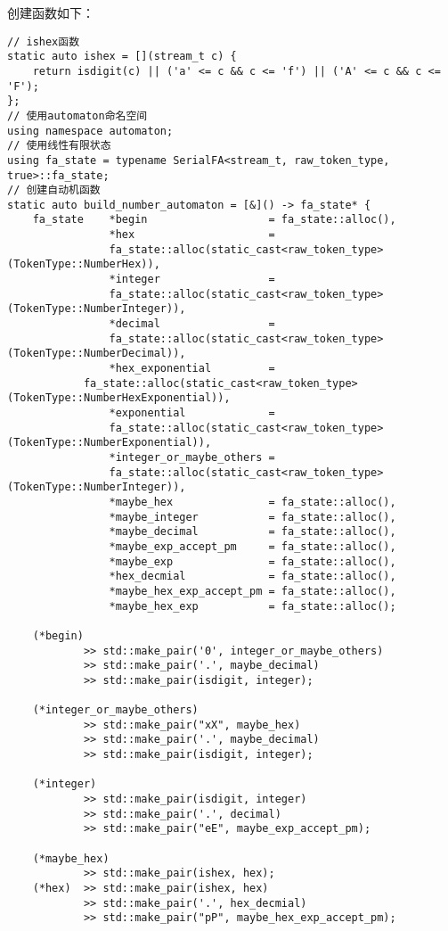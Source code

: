 \documentclass[UTF8]{ctexart}
\begin{document}
\par 创建函数如下：
{\firacode
\begin{lstlisting}[language={[ANSI]C++}]
// ishex函数
static auto ishex = [](stream_t c) {
    return isdigit(c) || ('a' <= c && c <= 'f') || ('A' <= c && c <= 'F');
};
// 使用automaton命名空间
using namespace automaton;
// 使用线性有限状态
using fa_state = typename SerialFA<stream_t, raw_token_type, true>::fa_state;
// 创建自动机函数
static auto build_number_automaton = [&]() -> fa_state* {
    fa_state    *begin                   = fa_state::alloc(),
                *hex                     = 
                fa_state::alloc(static_cast<raw_token_type>(TokenType::NumberHex)),
                *integer                 = 
                fa_state::alloc(static_cast<raw_token_type>(TokenType::NumberInteger)),
                *decimal                 = 
                fa_state::alloc(static_cast<raw_token_type>(TokenType::NumberDecimal)),
                *hex_exponential         = 
            fa_state::alloc(static_cast<raw_token_type>(TokenType::NumberHexExponential)),
                *exponential             = 
                fa_state::alloc(static_cast<raw_token_type>(TokenType::NumberExponential)),
                *integer_or_maybe_others = 
                fa_state::alloc(static_cast<raw_token_type>(TokenType::NumberInteger)),
                *maybe_hex               = fa_state::alloc(),
                *maybe_integer           = fa_state::alloc(),
                *maybe_decimal           = fa_state::alloc(),
                *maybe_exp_accept_pm     = fa_state::alloc(),
                *maybe_exp               = fa_state::alloc(),
                *hex_decmial             = fa_state::alloc(),
                *maybe_hex_exp_accept_pm = fa_state::alloc(),
                *maybe_hex_exp           = fa_state::alloc();
    
    (*begin)
            >> std::make_pair('0', integer_or_maybe_others)
            >> std::make_pair('.', maybe_decimal)
            >> std::make_pair(isdigit, integer);

    (*integer_or_maybe_others)
            >> std::make_pair("xX", maybe_hex)
            >> std::make_pair('.', maybe_decimal)
            >> std::make_pair(isdigit, integer);
    
    (*integer)
            >> std::make_pair(isdigit, integer)
            >> std::make_pair('.', decimal)
            >> std::make_pair("eE", maybe_exp_accept_pm);
    
    (*maybe_hex)
            >> std::make_pair(ishex, hex);
    (*hex)  >> std::make_pair(ishex, hex)
            >> std::make_pair('.', hex_decmial)
            >> std::make_pair("pP", maybe_hex_exp_accept_pm);
    

\end{lstlisting}}
\end{document}
